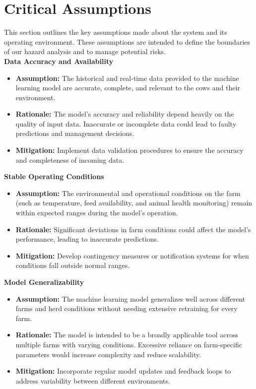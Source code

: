 \documentclass{article}
\begin{document}
\section{Critical Assumptions}

This section outlines the key assumptions made about the system and its 
operating environment. These assumptions are intended to define the boundaries 
of our hazard analysis and to manage potential risks.\\

\textbf{Data Accuracy and Availability}
\begin{itemize}
    \item \textbf{Assumption:} The historical and real-time data provided to the 
    machine learning model are accurate, complete, and relevant to the cows and 
    their environment.
    \item \textbf{Rationale:} The model's accuracy and reliability depend heavily 
    on the quality of input data. Inaccurate or incomplete data could lead to 
    faulty predictions and management decisions.
    \item \textbf{Mitigation:} Implement data validation procedures to ensure 
    the accuracy and completeness of incoming data.
\end{itemize}

\textbf{Stable Operating Conditions}
\begin{itemize}
    \item \textbf{Assumption:} The environmental and operational conditions on 
    the farm (such as temperature, feed availability, and animal health 
    monitoring) remain within expected ranges during the model's operation.
    \item \textbf{Rationale:} Significant deviations in farm conditions could 
    affect the model's performance, leading to inaccurate predictions.
    \item \textbf{Mitigation:} Develop contingency measures or notification 
    systems for when conditions fall outside normal ranges.
\end{itemize}

\textbf{Model Generalizability}
\begin{itemize}
    \item \textbf{Assumption:} The machine learning model generalizes well 
    across different farms and herd conditions without needing extensive 
    retraining for every farm.
    \item \textbf{Rationale:} The model is intended to be a broadly applicable 
    tool across multiple farms with varying conditions. Excessive reliance on 
    farm-specific parameters would increase complexity and reduce scalability.
    \item \textbf{Mitigation:} Incorporate regular model updates and feedback 
    loops to address variability between different environments.
\end{itemize}
\end{document}
